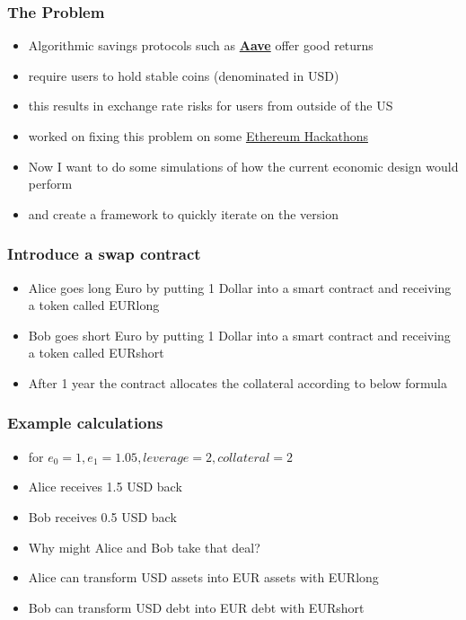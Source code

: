 \documentclass[11pt]{beamer}
\begin{document}
\begin{frame}[t]
    \frametitle{The Problem}
    \begin{itemize}
        \item Algorithmic savings protocols such as \href{https://app.aave.com/}{\bf{Aave}} offer good returns
        \item require users to hold stable coins (denominated in USD)
        \item this results in exchange rate risks for users from outside of the US
        \item worked on fixing this problem on some \href{https://ethglobal.online/}{Ethereum Hackathons}
        \item Now I want to do some simulations of how the current economic design would perform
        \item and create a framework to quickly iterate on the version
    \end{itemize}
    \note{~}
\end{frame}


\begin{frame}[t]
    \frametitle{Introduce a swap contract}
    \begin{itemize}
        \item Alice goes long Euro by putting 1 Dollar into a smart contract and receiving a token called EURlong
        \item Bob goes short Euro by putting 1 Dollar into a smart contract and receiving a token called EURshort
        \item After 1 year the contract allocates the collateral according to below formula
    \end{itemize}
    

    \note{~}
\end{frame}

\begin{frame}[t]
    \frametitle{Example calculations}
    \begin{itemize}
        \item for $e_0 = 1, e_1 = 1.05, leverage = 2, collateral = 2$
        \item Alice receives 1.5 USD back
        \item Bob receives 0.5 USD back
        \item Why might Alice and Bob take that deal?
        \item Alice can transform USD assets into EUR assets with EURlong
        \item Bob can transform USD debt into EUR debt with EURshort
    \end{itemize}

    \note{~}
\end{frame}
\end{document}
